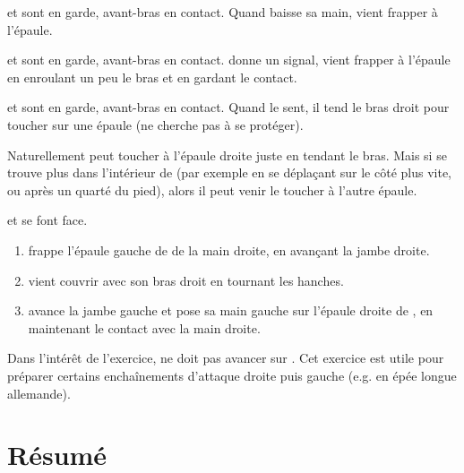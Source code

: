 \begin{exercice}
\label{struct:ex:contact:frappe-signal}

\A et \D sont en garde, avant-bras en contact.
Quand \A baisse sa main, \D vient frapper à l'épaule.

\end{exercice}


\begin{exercice}

\A et \D sont en garde, avant-bras en contact.
\A donne un signal, \D vient frapper à l'épaule en enroulant un peu le bras et en gardant le contact.

\end{exercice}


\begin{exercice}
\label{struct:ex:contact:frappe-épaules}

\A et \D sont en garde, avant-bras en contact.
Quand \A le sent, il tend le bras droit pour toucher \D sur une épaule (\D ne cherche pas à se protéger).

Naturellement \A peut toucher \D à l'épaule droite juste en tendant le bras.
Mais si \A se trouve plus dans l'intérieur de \D (par exemple en se déplaçant sur le côté plus vite, ou après un quarté du pied), alors il peut venir le toucher à l'autre épaule.
\end{exercice}


\begin{exercice}
\label{struct:ex:frappe-gauche-droite}

\A et \D se font face.

\begin{enumerate}
	\item \A frappe l'épaule gauche de \D de la main droite, en avançant la jambe droite.
	\item \D vient couvrir avec son bras droit en tournant les hanches.
	\item \A avance la jambe gauche et pose sa main gauche sur l'épaule droite de \D, en maintenant le contact avec la main droite.
\end{enumerate}

Dans l'intérêt de l'exercice, \D ne doit pas avancer sur \A.
Cet exercice est utile pour préparer certains enchaînements d'attaque droite puis gauche (e.g.
en épée longue allemande).
\end{exercice}



\section{Résumé}


